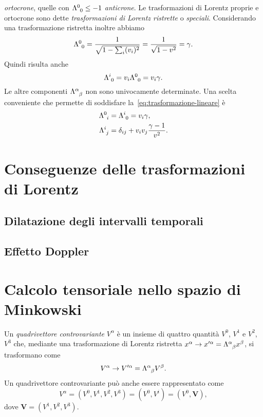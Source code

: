 \emph{ortocrone}, quelle con $\tensor{\Lambda}{^{0}_{0}} \leq -1$
\emph{anticrone}.  Le trasformazioni di Lorentz proprie e ortocrone sono dette
\emph{trasformazioni di Lorentz ristrette} o \emph{speciali}.  Considerando una
trasformazione ristretta inoltre abbiamo
\begin{equation}
  \tensor{\Lambda}{^{0}_{0}} = \frac{1}{\sqrt{1-\sum_{i}(v_{i})^{2}}} =
  \frac{1}{\sqrt{1-v^{2}}} = \gamma.
\end{equation}
Quindi risulta anche
\begin{equation}
  \tensor{\Lambda}{^{i}_{0}} = v_{i}\tensor{\Lambda}{^{0}_{0}} = v_{i}\gamma.
\end{equation}
Le altre componenti $\tensor{\Lambda}{^{\alpha}_{\beta}}$ non sono univocamente
determinate.  Una scelta conveniente che permette di soddisfare
la~\eqref{eq:trasformazione-lineare} è
\begin{subequations}
  \begin{align}
    \tensor{\Lambda}{^{0}_{i}} &= \tensor{\Lambda}{^{i}_{0}} = v_{i}\gamma, \\
    \tensor{\Lambda}{^{i}_{j}} &= \delta_{ij} +
    v_{i}v_{j}\frac{\gamma-1}{v^{2}}.
  \end{align}
\end{subequations}

\section{Conseguenze delle trasformazioni di Lorentz}
\label{sec:conseguenze-lorentz}

\subsection{Dilatazione degli intervalli temporali}
\label{sec:dilatazione-tempo}

\subsection{Effetto Doppler}
\label{sec:effetto-doppler}

\section{Calcolo tensoriale nello spazio di Minkowski}
\label{sec:calcolo-tensoriale}

Un \emph{quadrivettore controvariante}
$V^{\alpha}$ è un insieme di quattro quantità $V^{0}$, $V^{1}$ e $V^{2}$,
$V^{3}$ che, mediante una trasformazione di Lorentz ristretta
$x^{\alpha} \to x'^{\alpha} = \tensor{\Lambda}{^{\alpha}_{\beta}}x^{\beta}$, si
trasformano come
\begin{equation}
  V^{\alpha} \to V'^{\alpha} = \tensor{\Lambda}{^{\alpha}_{\beta}}V^{\beta}.
\end{equation}
Un quadrivettore controvariante può anche essere rappresentato come
\begin{equation}
  V^{\alpha} = (V^{0}, V^{1}, V^{2}, V^{3}) = (V^{0}, V^{i}) = (V^{0}, \bm{V}),
\end{equation}
dove $\bm{V} = (V^{1}, V^{2}, V^{3})$.


